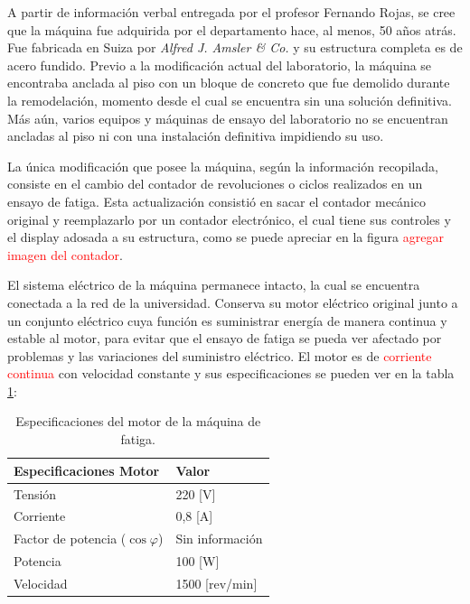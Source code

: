 A partir de información verbal entregada por el profesor Fernando Rojas, se cree que la máquina fue adquirida por el departamento hace, al menos, 50 años atrás. Fue fabricada en Suiza por \textit{Alfred J. Amsler \& Co.} y su estructura completa es de acero fundido. Previo a la modificación actual del laboratorio, la máquina se encontraba anclada al piso con un bloque de concreto que fue demolido durante la remodelación, momento desde el cual se encuentra sin una solución definitiva. Más aún, varios equipos y máquinas de ensayo del laboratorio no se encuentran ancladas al piso ni con una instalación definitiva impidiendo su uso.

La única modificación que posee la máquina, según la información recopilada, consiste en el cambio del contador de revoluciones o ciclos realizados en un ensayo de fatiga. Esta actualización consistió en sacar el contador mecánico original y reemplazarlo por un contador electrónico, el cual tiene sus controles y el display adosada a su estructura, como se puede apreciar en la figura \textcolor{red}{agregar imagen del contador}. 

El sistema eléctrico de la máquina permanece intacto, la cual se encuentra conectada a la red de la universidad. Conserva su motor eléctrico original junto a un conjunto eléctrico cuya función es suministrar energía de manera continua y estable al motor, para evitar que el ensayo de fatiga se pueda ver afectado por problemas y las variaciones del suministro eléctrico. El motor es de \textcolor{red}{corriente continua} con velocidad constante y sus especificaciones se pueden ver en la tabla \ref{tab:motor_maq}:

\begin{table}[h]
\centering
\begin{tabular}{ll}
\hline
Especificaciones Motor                            & Valor   				\\ \hline
Tensión                                           & 220 {[}V{]}        		\\
Corriente                                         & 0,8 {[}A{]}        		\\
Factor de potencia ($\cos \varphi$)				  & Sin información    		\\
Potencia                                          & 100 {[}W{]}        		\\
Velocidad                                         & 1500 {[}rev/min{]} 		\\ \hline
\end{tabular}
\caption{Especificaciones del motor de la máquina de fatiga.}
\label{tab:motor_maq}
\end{table}

